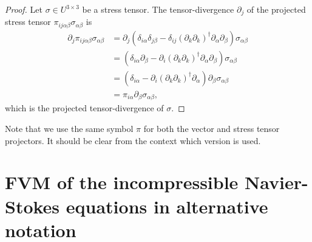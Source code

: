 \documentclass[preprint,twocolumn,5p]{elsarticle}
\begin{document}
\begin{proof}
    Let $\sigma \in U^{3 \times 3}$ be a stress tensor.
    The tensor-divergence $\partial_j$ of the projected stress tensor $\pi_{i j \alpha \beta} \sigma_{\alpha \beta}$ is
    \begin{equation}
    \begin{split}
        \partial_j \pi_{i j \alpha \beta} \sigma_{\alpha \beta}
        & = \partial_j \left( \delta_{i \alpha} \delta_{j \beta}
            - \delta_{i j} (\partial_k \partial_k)^{\dagger} \partial_\alpha
            \partial_\beta \right) \sigma_{\alpha \beta} \\
        & = \left(
            \delta_{i \alpha} \partial_\beta -
            \partial_i (\partial_k \partial_k)^{\dagger} \partial_\alpha \partial_\beta \right)
            \sigma_{\alpha \beta} \\
        & = \left(
            \delta_{i \alpha} -
            \partial_i (\partial_k \partial_k)^{\dagger} \partial_\alpha \right)
            \partial_\beta \sigma_{\alpha \beta} \\
        & = \pi_{i \alpha} \partial_\beta \sigma_{\alpha \beta},
    \end{split}
    \end{equation}
    which is the projected tensor-divergence of $\sigma$.
\end{proof}

Note that we use the same symbol $\pi$ for both the vector and stress tensor projectors.
It should be clear from the context which version is used.

\section{FVM of the incompressible Navier-Stokes equations in alternative notation}
\label{sec:cartesian-notation}
\end{document}
